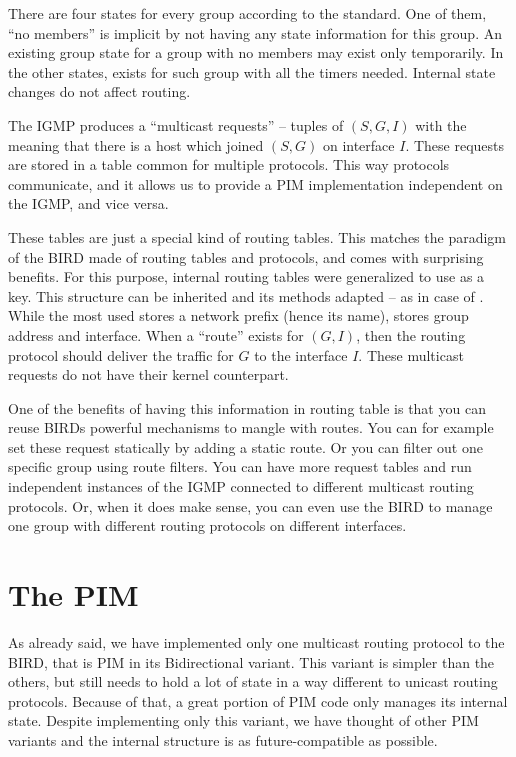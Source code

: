 There are four states for every group according to the standard. One of them,
``no members'' is implicit by not having any state information for this group.
An existing group state for a group with no members may exist only temporarily.
In the other states,  exists for such group with all
the timers needed. Internal state changes do not affect routing.

The IGMP produces a ``multicast requests'' -- tuples of $(S, G, I)$ with the
meaning that there is a host which joined $(S, G)$ on interface $I$. These
requests are stored in a table common for multiple protocols. This way
protocols communicate, and it allows us to provide a PIM implementation
independent on the IGMP, and vice versa.

These tables are just a special kind of routing tables. This matches the
paradigm of the BIRD made of routing tables and protocols, and comes with
surprising benefits. For this purpose, internal routing tables were generalized
to use  as a key. This structure can be inherited and
its methods adapted -- as in case of . While the most
used  stores a network prefix (hence its name),
 stores group address and interface. When a ``route''
exists for $(G, I)$, then the routing protocol should deliver the traffic for
$G$ to the interface $I$. These multicast requests do not have their kernel
counterpart.

One of the benefits of having this information in routing table is that you can
reuse BIRDs powerful mechanisms to mangle with routes. You can for example set
these request statically by adding a static route. Or you can filter out one
specific group using route filters. You can have more request tables and run
independent instances of the IGMP connected to different multicast routing
protocols. Or, when it does make sense, you can even use the BIRD to manage one
group with different routing protocols on different interfaces.

\section{The PIM}

As already said, we have implemented only one multicast routing protocol to the
BIRD, that is PIM in its Bidirectional variant. This variant is simpler than
the others, but still needs to hold a lot of state in a way different to
unicast routing protocols. Because of that, a great portion of PIM code only
manages its internal state. Despite implementing only this variant, we have
thought of other PIM variants and the internal structure is as
future-compatible as possible.

